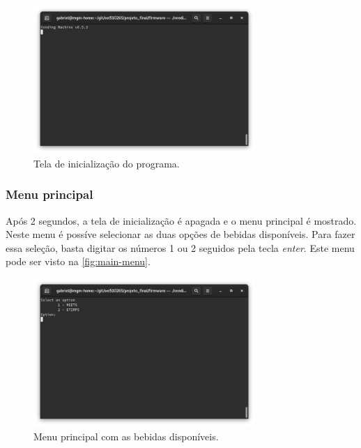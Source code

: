 \begin{figure}[!ht]
    \begin{center}
        \includegraphics[width=0.75\textwidth]{figures/splash-screen.png}
        \caption{Tela de inicialização do programa.}
        \label{fig:splash-screen}
    \end{center}
\end{figure}

\subsubsection{Menu principal}

Após 2 segundos, a tela de inicialização é apagada e o menu principal é mostrado. Neste menu é possíve selecionar as duas opções de bebidas disponíveis. Para fazer essa seleção, basta digitar os números 1 ou 2 seguidos pela tecla \textit{enter}. Este menu pode ser visto na \autoref{fig:main-menu}.

\begin{figure}[!ht]
    \begin{center}
        \includegraphics[width=0.75\textwidth]{figures/main-menu.png}
        \caption{Menu principal com as bebidas disponíveis.}
        \label{fig:main-menu}
    \end{center}
\end{figure}


